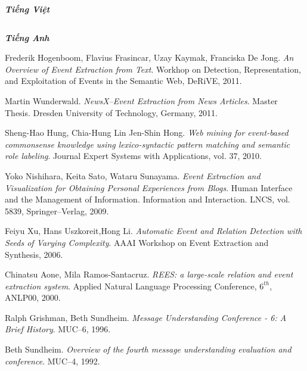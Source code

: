 \begin{thebibliography}{99}


\begin{flushright}
	{\Large\bf\emph{Tiếng Việt}}
\end{flushright}
$\;$	
\begin{flushright}
{\Large\bf\emph{Tiếng Anh}}
\end{flushright}
		 Frederik Hogenboom, Flavius Frasincar, Uzay Kaymak, Franciska De Jong. \emph{An Overview of Event Extraction from Text}. Workhop on Detection, Representation, and Exploitation of Events in the Semantic Web, DeRiVE, 2011.

		 Martin Wunderwald. \emph{NewsX--Event Extraction from News Articles}. Master Thesis. Dresden University of Technology, Germany, 2011.
	
		 Sheng-Hao Hung, Chia-Hung Lin Jen-Shin Hong. \emph{Web mining for event-based commonsense knowledge using lexico-syntactic pattern matching and semantic role labeling}. Journal Expert Systems with Applications, vol. 37, 2010.

		 Yoko Nishihara, Keita Sato, Wataru Sunayama. \emph{Event Extraction and Visualization for Obtaining Personal Experiences from Blogs}. Human Interface and the Management of Information. Information and Interaction. LNCS, vol. 5839, Springer--Verlag, 2009.

		 Feiyu Xu, Hans Uszkoreit,Hong Li. \emph{Automatic Event and Relation Detection
with Seeds of Varying Complexity}. AAAI Workshop on Event Extraction and Synthesis, 2006.

		 Chinatsu Aone, Mila Ramos-Santacruz. \emph{REES: a large-scale relation and event extraction system}. Applied Natural Language Processing Conference, $6^{th}$, ANLP00, 2000.

		 Ralph Grishman, Beth Sundheim. \emph{Message Understanding Conference - 6: A Brief History}. MUC--6, 1996.

		Beth Sundheim. \emph{Overview of the fourth message understanding evaluation and conference}. MUC--4, 1992.
%
	
\end{thebibliography}
